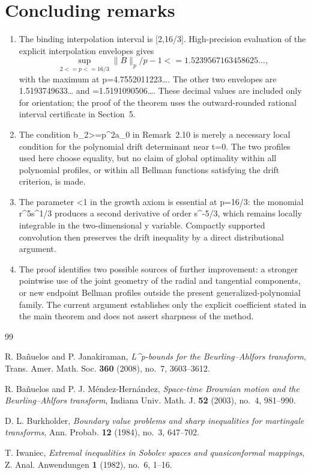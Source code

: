 \documentclass[10pt,reqno]{amsart}
\def\({}\def\){}%
\def\frac#1#2{#1/#2}%
\def\ge{>=}\def\le{<=}%
\theoremstyle{definition}
\theoremstyle{remark}
\begin{document}
\section{Concluding remarks}\label{sec:remarks}

\begin{enumerate}[label=\textup{(\arabic*)},leftmargin=*]
\item
The binding interpolation interval is \([2,16/3]\).  High-precision evaluation
of the explicit interpolation envelopes gives
\[
 \sup_{2\le p\le16/3}\frac{\|B\|_p}{p-1}
 \le 1.5239567163458625\ldots,
\]
with the maximum at \(p=4.7552011223\ldots\).  The other two envelopes are
\(1.5193749633\ldots\) and \(=1.5191090506\ldots\).  These decimal
values are included only for orientation; the proof of the theorem uses the
outward-rounded rational interval certificate in Section~5.

\item
The condition \(b_2\ge p^2a_0\) in Remark~2.10 is merely a necessary local
condition for the polynomial drift determinant near \(t=0\).  The two profiles
used here choose equality, but no claim of global optimality within all polynomial
profiles, or within all Bellman functions satisfying the drift criterion, is made.

\item
The parameter \(\theta<1\) in the growth axiom is essential at
\(p=16/3\): the monomial \(r^5s^{1/3}\) produces a second derivative of order
\(s^{-5/3}\), which remains locally integrable in the two-dimensional \(y\)
variable.  Compactly supported convolution then preserves the drift inequality
by a direct distributional argument.

\item
The proof identifies two possible sources of further improvement: a stronger
pointwise use of the joint geometry of the radial and tangential components, or
new endpoint Bellman profiles outside the present generalized-polynomial family.
The current argument establishes only the explicit coefficient stated in the main
theorem and does not assert sharpness of the method.
\end{enumerate}

\begin{thebibliography}{99}

R. Bañuelos and P. Janakiraman,
\emph{\(L^p\)-bounds for the Beurling--Ahlfors transform},
Trans. Amer. Math. Soc. \textbf{360} (2008), no.~7, 3603--3612.

R. Bañuelos and P. J. Méndez-Hernández,
\emph{Space-time Brownian motion and the Beurling--Ahlfors transform},
Indiana Univ. Math. J. \textbf{52} (2003), no.~4, 981--990.

D. L. Burkholder,
\emph{Boundary value problems and sharp inequalities for martingale transforms},
Ann. Probab. \textbf{12} (1984), no.~3, 647--702.

T. Iwaniec,
\emph{Extremal inequalities in Sobolev spaces and quasiconformal mappings},
Z. Anal. Anwendungen \textbf{1} (1982), no.~6, 1--16.

\end{thebibliography}
\end{document}
